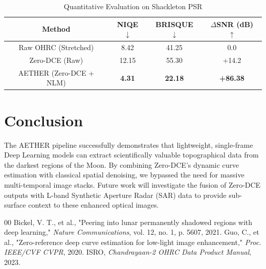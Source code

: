 \documentclass[conference]{IEEEtran}
\begin{document}
\begin{table}[htbp]
\caption{Quantitative Evaluation on Shackleton PSR}
\begin{center}
\begin{tabular}{|c|c|c|c|}
\hline
\textbf{Method} & \textbf{NIQE} $\downarrow$ & \textbf{BRISQUE} $\downarrow$ & \textbf{$\Delta$SNR (dB)} $\uparrow$ \\
\hline
Raw OHRC (Stretched) & 8.42 & 41.25 & 0.0 \\
\hline
Zero-DCE (Raw) & 12.15 & 55.30 & +14.2 \\
\hline
AETHER (Zero-DCE + NLM) & \textbf{4.31} & \textbf{22.18} & \textbf{+86.38} \\
\hline
\end{tabular}
\label{tab:metrics}
\end{center}
\end{table}

\section{Conclusion}
The AETHER pipeline successfully demonstrates that lightweight, single-frame Deep Learning models can extract scientifically valuable topographical data from the darkest regions of the Moon. By combining Zero-DCE's dynamic curve estimation with classical spatial denoising, we bypassed the need for massive multi-temporal image stacks. Future work will investigate the fusion of Zero-DCE outputs with L-band Synthetic Aperture Radar (SAR) data to provide sub-surface context to these enhanced optical images.

\begin{thebibliography}{00}
 Bickel, V. T., et al., "Peering into lunar permanently shadowed regions with deep learning," \textit{Nature Communications}, vol. 12, no. 1, p. 5607, 2021.
 Guo, C., et al., "Zero-reference deep curve estimation for low-light image enhancement," \textit{Proc. IEEE/CVF CVPR}, 2020.
 ISRO, \textit{Chandrayaan-2 OHRC Data Product Manual}, 2023.
\end{thebibliography}
\end{document}
